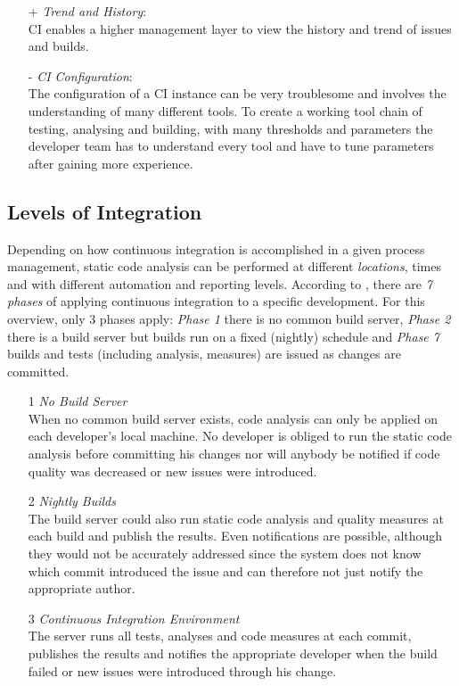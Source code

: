 \documentclass[conference]{IEEEtran}
\begin{document}
\begin{itemize}
	\item[+] \textit{Trend and History}:\\
	CI enables a higher management layer to view the history and trend of issues and builds.
	
	\item[-] \textit{CI Configuration}:\\
	The configuration of a CI instance can be very troublesome and involves the understanding of many different tools. To create a working tool chain of testing, analysing and building, with many thresholds and parameters the developer team has to understand every tool and have to tune parameters after gaining more experience.
\end{itemize}



\subsection{Levels of Integration}
\label{subsec:ci_levels_of_integration}
Depending on how continuous integration is accomplished in a given process management, static code analysis can be performed at different \textit{locations}, times and with different automation and reporting levels. According to \cite[p. 6ff]{Jenkins:Smart:2011}, there are \textit{7 phases} of applying continuous integration to a specific development. For this overview, only 3 phases apply: \textit{Phase 1} there is no common build server, \textit{Phase 2} there is a build server but builds run on a fixed (nightly) schedule and \textit{Phase 7} builds and tests (including analysis, measures) are issued as changes are committed.

\begin{itemize}
	\item[1] \textit{No Build Server} \\
	When no common build server exists, code analysis can only be applied on each developer's local machine. No developer is obliged to run the static code analysis before committing his changes nor will anybody be notified if code quality was decreased or new issues were introduced.
	
	
	\item[2] \textit{Nightly Builds} \\
	The build server could also run static code analysis and quality measures at each build and publish the results. Even notifications are possible, although they would not be accurately addressed since the system does not know which commit introduced the issue and can therefore not just notify the appropriate author.
	
	\item[3] \textit{Continuous Integration Environment} \\
	The server runs all tests, analyses and code measures at each commit, publishes the results and notifies the appropriate developer when the build failed or new issues were introduced through his change.
\end{itemize}
\end{document}
